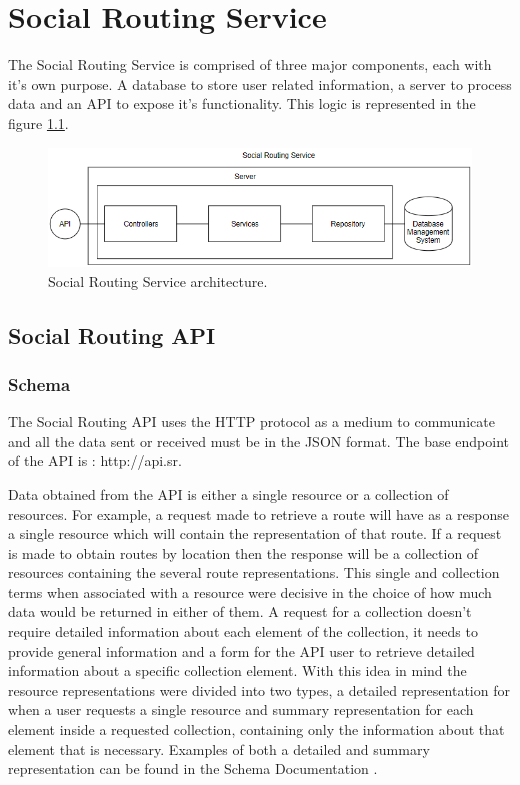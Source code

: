 \chapter{Social Routing Service}

The Social Routing Service is comprised of three major components, each with it's own purpose. 
A database to store user related information, a server to process data and an API to expose it's functionality.
This logic is represented in the figure \ref{fig:socialroutingservice}.

\begin{figure}[ht]            
    \includegraphics[width=\textwidth]{images/project-structure/service-structure.PNG}
    \caption{Social Routing Service architecture.}
    \label{fig:socialroutingservice}
\end{figure}  

\section*{Social Routing API}

    \subsection*{Schema}
        The Social Routing API uses the HTTP protocol as a medium to 
        communicate and all the data sent or received must be in the JSON format.
        The base endpoint of the API is : http://api.sr.\par
        Data obtained from the API is either a single resource or a collection of resources. For example, a request
        made to retrieve a route will have as a response a single resource which will contain the representation of that
        route. If a request is made to obtain routes by location then the response will be a collection of resources containing
        the several route representations. This single and collection terms when associated with a
        resource were decisive in the choice of how much data would be returned in either of them. A request for a collection
        doesn't require detailed information about each element of the collection, it needs to provide general information and
        a form for the API user to retrieve detailed information about a specific collection element.
        With this idea in mind the resource representations were divided into two types, a detailed representation for when a user
        requests a single resource and summary representation for each element inside a requested collection, containing only the 
        information about that element that is necessary.
        Examples of both a detailed and summary representation can be found in the Schema Documentation \cite{schemadocs}.    
    
